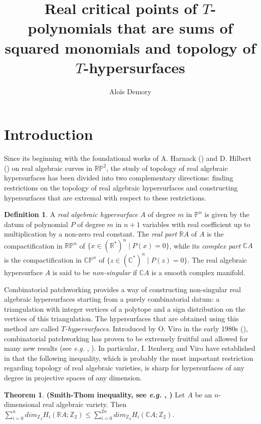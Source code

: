\documentclass[12pt]{article}
\title{Real critical points of $T$-polynomials that are sums of squared monomials and topology of $T$-hypersurfaces}
\author{Aloïs Demory}
\date{}
\newcommand{\R}{\mathbb{R}}
\newcommand{\C}{\mathbb{C}}
\renewcommand{\P}{\mathbb{P}}
\theoremstyle{definition}
\newtheorem{defin}{Definition}[section]
\newtheorem*{thm*}{Theorem}
\begin{document}
\maketitle

\tableofcontents

\section{Introduction}

Since its beginning with the foundational works of A. Harnack (\cite{harnack}) and D. Hilbert (\cite{Hilbert1933}) on real algebraic curves in $\R \P^2$, the study of topology of real algebraic hypersurfaces has been divided into two complementary directions: finding restrictions on the topology of real
algebraic hypersurfaces and constructing hypersurfaces that are extremal with respect to these restrictions.

\begin{defin}
    A \textit{real algebraic hypersurface} $A$ of degree $m$ in $\P^n$ is given by the datum of polynomial $P$ of degree $m$ in $n+1$ variables with real coefficient up to multiplication by a non-zero real constant. The \textit{real part} $\R A$ of $A$ is the compactification in $\R \P^n$ of $\{x \in (\R^*)^n \; | \; P(x)=0  \}$, while its \textit{complex part} $\C A$ is the compactification in $\C \P^n$ of $\{z \in (\C^*)^n \; | \; P(z)=0  \}$.  The real algebraic hypersurface $A$ is said to be \textit{non-singular} if $\mathbb{C}A$ is a smooth complex manifold.
\end{defin}
 
Combinatorial patchworking provides a way of constructing non-singular real algebraic hypersurfaces starting from a purely combinatorial datum: a triangulation with integer vertices of a polytope and a sign distribution on the vertices of this triangulation. The hypersurfaces that are obtained using this method are called $T$\textit{-hypersurfaces}. Introduced by O. Viro in the early 1980s (\cite{Vir83}), combinatorial patchworking has proven to be extremely fruitful and allowed for many new results (see \textit{e.g.} \cite{tsurf}, \cite{itenbergviro2007}). In particular, I. Itenberg and Viro have established in \cite{fakeitenbergviro} that the following inequality, which is probably the most important restriction regarding topology of real algebraic varieties, is sharp for hypersurfaces of any degree in projective spaces of any dimension.

\begin{thm*}
    \label{smith}
    \textbf{(Smith-Thom inequality, see \textit{e.g.} \cite{floyd}, \cite{bredon})}
    Let $A$ be an $n$-dimensional real algebraic variety. Then $\sum_{i=0}^{n} dim_{\mathbb{Z}_2}H_i(\mathbb{R}A;\mathbb{Z}_2) \leq \sum_{i=0}^{2n} dim_{\mathbb{Z}_2}H_i(\mathbb{C}A;\mathbb{Z}_2)$.
\end{thm*}
\end{document}
